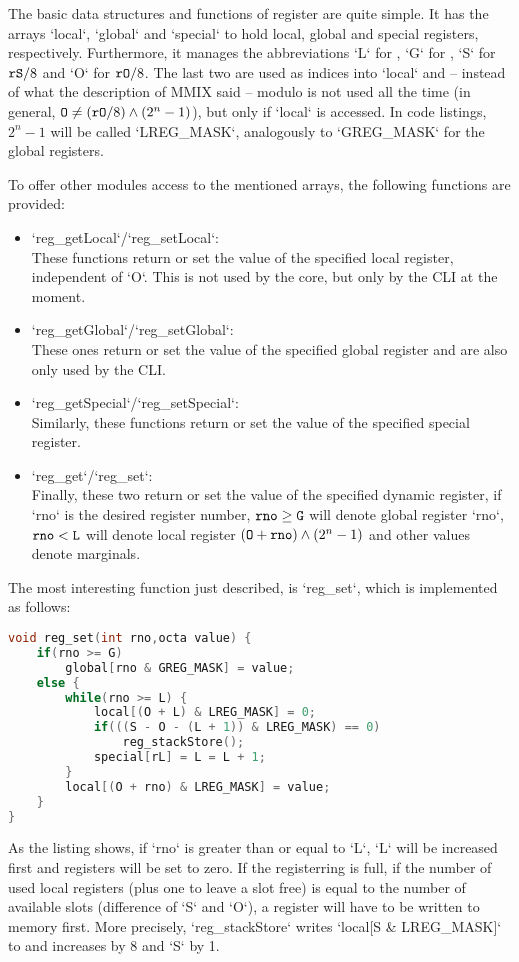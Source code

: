 The basic data structures and functions of register are quite simple. It has the arrays `local`, `global` and `special` to hold local, global and special registers, respectively. Furthermore, it manages the abbreviations `L` for , `G` for , `S` for ${\tt rS}/8$ and `O` for ${\tt rO}/8$. The last two are used as indices into `local` and -- instead of what the description of MMIX said -- modulo is not used all the time (\ie in general, ${\tt O} \ne ({\tt rO}/8) \land (2^n-1)$), but only if `local` is accessed. In code listings, $2^n-1$ will be called `LREG_MASK`, analogously to `GREG_MASK` for the global registers.

To offer other modules access to the mentioned arrays, the following functions are provided:
\begin{itemize}
	\item `reg_getLocal`/`reg_setLocal`:\\
	These functions return or set the value of the specified local register, independent of `O`. This is not used by the core, but only by the CLI at the moment.
	\item `reg_getGlobal`/`reg_setGlobal`:\\
	These ones return or set the value of the specified global register and are also only used by the CLI.
	\item `reg_getSpecial`/`reg_setSpecial`:\\
	Similarly, these functions return or set the value of the specified special register.
	\item `reg_get`/`reg_set`:\\
	Finally, these two return or set the value of the specified dynamic register, \ie if `rno` is the desired register number, ${\tt rno} \ge {\tt G}$ will denote global register `rno`, ${\tt rno} < {\tt L}$ will denote local register $({\tt O}+{\tt rno}) \land (2^n-1)$ and other values denote marginals.
\end{itemize}
The most interesting function just described, is `reg_set`, which is implemented as follows:
\begin{lstlisting}[language=C,caption=Implementation of {\tt reg\_set}]
void reg_set(int rno,octa value) {
	if(rno >= G)
		global[rno & GREG_MASK] = value;
	else {
		while(rno >= L) {
			local[(O + L) & LREG_MASK] = 0;
			if(((S - O - (L + 1)) & LREG_MASK) == 0)
				reg_stackStore();
			special[rL] = L = L + 1;
		}
		local[(O + rno) & LREG_MASK] = value;
	}
}
\end{lstlisting}
As the listing shows, if `rno` is greater than or equal to `L`, `L` will be increased first and registers will be set to zero. If the registerring is full, \ie if the number of used local registers (plus one to leave a slot free) is equal to the number of available slots (difference of `S` and `O`), a register will have to be written to memory first. More precisely, `reg_stackStore` writes `local[S & LREG_MASK]` to  and increases  by 8 and `S` by 1.

